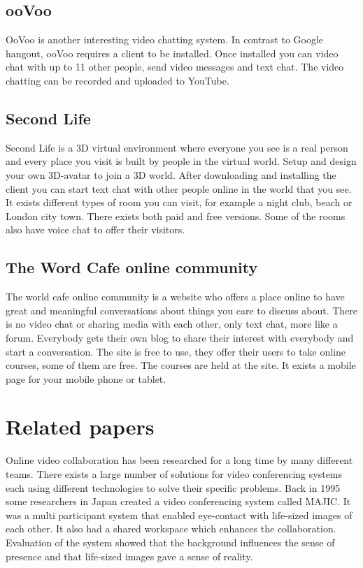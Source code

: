 \documentclass[12pt, titlepage]{article}
\begin{document}
\subsection{ooVoo}
OoVoo\cite{4} is another interesting video chatting system. In contrast to Google hangout, ooVoo requires a client to be installed. Once installed you can video chat with up to 11 other people, send video messages and text chat. The video chatting can be recorded and uploaded to YouTube.
\subsection{Second Life}
Second Life\cite{5} is a 3D virtual environment where everyone you see is a real person and every place you visit is built by people in the virtual world. Setup and design your own 3D-avatar to join a 3D world. After downloading and installing the client you can start text chat with other people online in the world that you see. It exists different types of room you can visit, for example a night club, beach or London city town. There exists both paid and free versions. Some of the rooms also have voice chat to offer their visitors.
\subsection{The Word Cafe online community}
The world cafe online community\cite{18} is a website who offers a place online to have great and meaningful conversations about things you care to discuss about. There is no video chat or sharing media with each other, only text chat, more like a forum. Everybody gets their own blog to share their interest with everybody and start a conversation. The site is free to use, they offer their users to take online courses, some of them are free. The courses are held at the site. It exists a mobile page for your mobile phone or tablet.

\section{Related papers}
Online video collaboration has been researched for a long time by many different teams. There exists a large number of solutions for video conferencing systems each using different technologies to solve their specific problems. Back in 1995 some researchers in Japan created a video conferencing system called MAJIC\cite{19}. It was a multi participant system that enabled eye-contact with life-sized images of each other. It also had a shared workspace which enhances the collaboration. Evaluation of the system showed that the background influences the sense of presence and that life-sized images gave a sense of reality.
\end{document}
